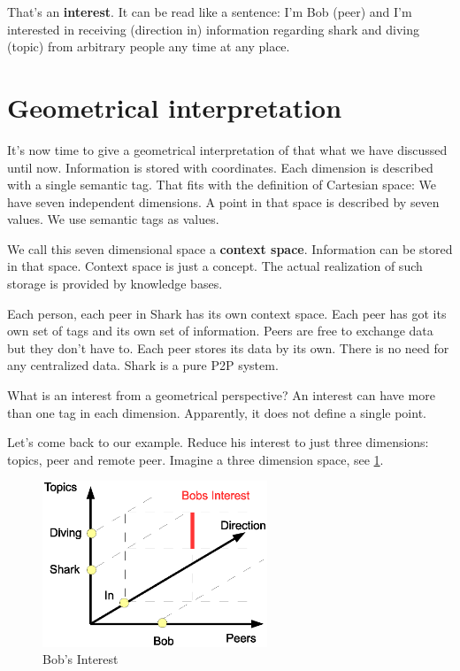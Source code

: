 That's an {\bf interest}. It can be read like a sentence: I'm Bob (peer) and I'm interested in receiving (direction in) information regarding shark and diving (topic) from arbitrary people any time at any place.

\section{Geometrical interpretation}
It's now time to give a geometrical interpretation of that what we have discussed until now. Information is stored with coordinates. Each dimension is described with a single semantic tag. That fits with the definition of Cartesian space: We have seven independent dimensions. A point in that space is described by seven values. We use semantic tags as values.

We call this seven dimensional space a {\bf context space}. Information can be stored in that space. Context space is just a concept. The actual realization of such storage is provided by knowledge bases.

Each person, each peer in Shark has its own context space. Each peer has got its own set of tags and its own set of information. Peers are free to exchange data but they don't have to. Each peer stores its data by its own. There is no need for any centralized data. Shark is a pure P2P system.

What is an interest from a geometrical perspective? An interest can have more than one tag in each dimension. Apparently, it does not define a single point. 

Let's come back to our example. Reduce his interest to just three dimensions: topics, peer and remote peer. Imagine a three dimension space, 
see \ref{fig:contextspace}. 

\begin{figure}[t]
\centering
\includegraphics[width=0.60\textwidth]{bobsInterest.eps}
\caption{Bob's Interest}
\label{fig:contextspace}
\end{figure}

